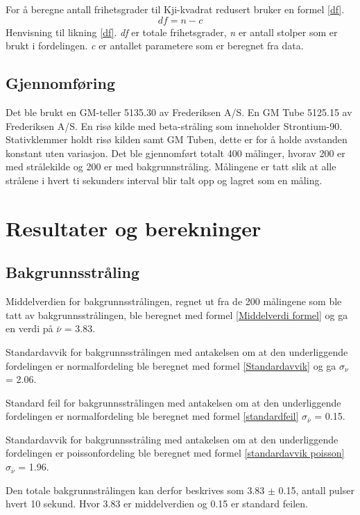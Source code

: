 \documentclass[twocolumn, 11pt]{article} %
\begin{document}
    For å beregne antall frihetsgrader til Kji-kvadrat redusert bruker en formel \eqref{df}.
    \begin{equation}
	\textit{df} = \textit{n} - \textit{c}
    \label{df}
    \end{equation}
    Henvisning til likning \eqref{df}. \textit{df} er totale frihetsgrader, \textit{n} er antall  stolper som er brukt i fordelingen. \textit{c} er antallet parametere som er beregnet fra data\cite{oppgavetekst}.


\subsection{Gjennomføring}
Det ble brukt en GM-teller 5135.30 av Frederiksen A/S. En GM Tube 5125.15 av Frederiksen A/S. En risø kilde med beta-stråling som inneholder Strontium-90.
Stativklemmer holdt risø kilden samt GM Tuben, dette er for å holde avstanden konstant uten variasjon. Det ble gjennomført totalt 400 målinger, hvorav 200 er med strålekilde og 200 er med bakgrunnstråling. Målingene er tatt slik at alle strålene i hvert ti sekunders interval blir talt opp og lagret som en måling.


\section{Resultater og berekninger}
\subsection{Bakgrunnsstråling} \label{Bakgrunnsstråling}
Middelverdien for bakgrunnsstrålingen, regnet ut fra de 200 målingene som ble tatt av bakgrunnsstrålingen, ble beregnet med formel \eqref{Middelverdi formel} og ga en verdi på \textit{$\bar\nu$} = 3.83.

Standardavvik for bakgrunnsstrålingen med antakelsen om at den underliggende fordelingen er normalfordeling ble beregnet med formel \eqref{Standardavvik} og ga
\textit{$\sigma_\nu$} = 2.06.

Standard feil for bakgrunnsstrålingen med antakelsen om at den underliggende fordelingen er normalfordeling ble beregnet med formel \eqref{standardfeil}
\textit{$\sigma_{\bar\nu}$} = 0.15.

Standardavvik for bakgrunnsstråling  med  antakelsen om at den underliggende fordelingen er poissonfordeling ble beregnet med formel \eqref{standardavvik poisson}
\textit{$\sigma_{\bar\nu}$} = 1.96.

Den totale bakgrunnstrålingen kan derfor beskrives som  3.83 $\pm$ 0.15, antall pulser hvert 10 sekund. Hvor 3.83 er middelverdien og 0.15 er standard feilen.
\end{document}
